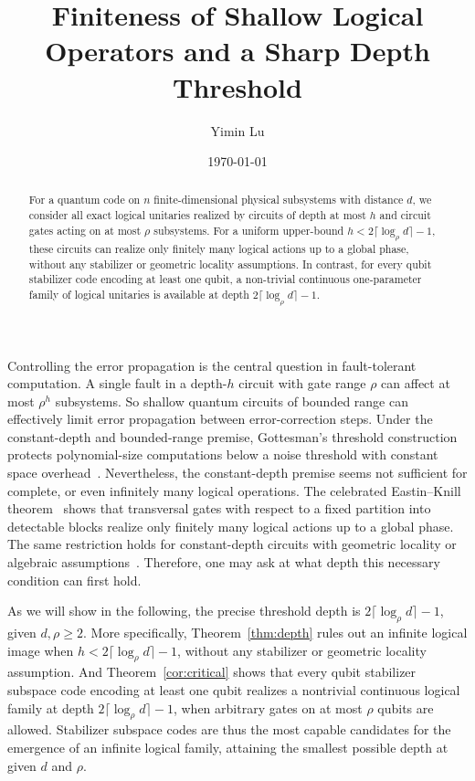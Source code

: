\documentclass[aps,prl,reprint,notitlepage,nofootinbib,nobibnotes]{revtex4-2}
\begin{document}
\title{Finiteness of Shallow Logical Operators and a Sharp Depth Threshold}
\author{Yimin Lu}
\date{\today}

\begin{abstract}
For a quantum code on $n$ finite-dimensional physical subsystems with distance $d$, we
consider all exact logical unitaries realized by circuits of depth at most $h$ and circuit
gates acting on at most $\rho$ subsystems. For a uniform upper-bound $h<2\lceil\log_{\rho} d\rceil-1$, these circuits can realize only finitely many logical actions up to a global
phase, without any stabilizer or geometric locality assumptions. In contrast, for every qubit stabilizer code encoding at least one qubit, a non-trivial continuous one-parameter family of logical unitaries is available at depth
$2\lceil\log_{\rho} d\rceil-1$.
\end{abstract}
\maketitle

Controlling the error propagation is the central question in
fault-tolerant computation. A single fault in a
depth-\(h\) circuit with gate range \(\rho\) can affect at most \(\rho^h\) subsystems. So shallow quantum
circuits of bounded range can effectively limit error propagation between
error-correction steps.  Under the constant-depth and bounded-range premise,
Gottesman's threshold construction protects polynomial-size
computations below a noise threshold with constant space
overhead~\cite{Gottesman}. Nevertheless, the constant-depth premise seems not sufficient for complete, or even infinitely many logical operations.
The celebrated Eastin--Knill theorem~\cite{EK} shows that transversal gates with respect to a fixed partition into detectable blocks realize only finitely many logical actions up to a global phase. The same restriction holds for constant-depth circuits with geometric locality or algebraic assumptions~\cite{BK,PY,JKY,Webster}.
Therefore, one may ask at what depth this necessary condition can first hold.


As we will show in the following, the precise threshold depth is \(2\lceil\log_{\rho} d\rceil-1\), given $d, \rho\geq 2$.
More specifically, Theorem~\ref{thm:depth} rules out an infinite logical image when
\(h<2\lceil\log_{\rho} d\rceil-1\), without any stabilizer or geometric locality
assumption. And Theorem~\ref{cor:critical} shows that every qubit stabilizer
subspace code encoding at least one qubit realizes a nontrivial
continuous logical family at depth \(2\lceil\log_{\rho} d\rceil-1\), when
arbitrary gates on at most \(\rho\) qubits are allowed. Stabilizer subspace
codes are thus the most capable candidates for the emergence of an infinite
logical family, attaining the smallest possible depth at given \(d\)
and \(\rho\).
\end{document}
